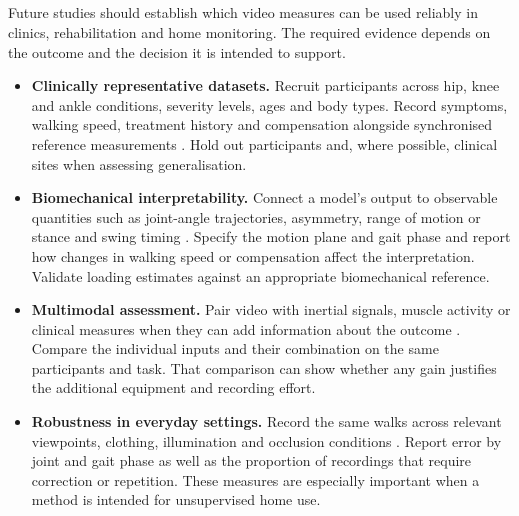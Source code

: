 \subsection{}
\label{sec:research_directions}
\begin{revision}
Future studies should establish which video measures can be used reliably in clinics, rehabilitation and home monitoring. The required evidence depends on the outcome and the decision it is intended to support.

\begin{itemize}
    \item \textbf{Clinically representative datasets.}
    Recruit participants across hip, knee and ankle conditions, severity levels, ages and body types. Record symptoms, walking speed, treatment history and compensation alongside synchronised reference measurements \cite{kaufman2001gait,weidow2006hip,ro2019effects,bacon2022relation}. Hold out participants and, where possible, clinical sites when assessing generalisation.

    \item \textbf{Biomechanical interpretability.}
    Connect a model's output to observable quantities such as joint-angle trajectories, asymmetry, range of motion or stance and swing timing \cite{ornetti2010gait,andriacchi2006role,astephen2008biomechanical,favre2016gait}. Specify the motion plane and gait phase and report how changes in walking speed or compensation affect the interpretation. Validate loading estimates against an appropriate biomechanical reference.

    \item \textbf{Multimodal assessment.}
    Pair video with inertial signals, muscle activity or clinical measures when they can add information about the outcome \cite{juri2020characterization,zhang2025myoelectric,zhang2024fall}. Compare the individual inputs and their combination on the same participants and task. That comparison can show whether any gain justifies the additional equipment and recording effort.

    \item \textbf{Robustness in everyday settings.}
    Record the same walks across relevant viewpoints, clothing, illumination and occlusion conditions \cite{ong2017efficacy,viswakumar2022omgait,van2023accuracy,wade2023examination}. Report error by joint and gait phase as well as the proportion of recordings that require correction or repetition. These measures are especially important when a method is intended for unsupervised home use.


\end{itemize}
\end{revision}
